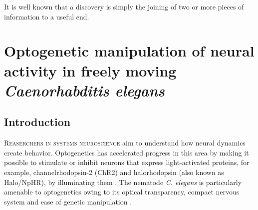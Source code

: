 
\begin{savequote}[75mm] 
It is well known that a discovery is simply the joining of two or more pieces of information to a useful end.
\end{savequote}


\chapter{Optogenetic manipulation of neural activity in freely moving \textit{Caenorhabditis elegans}}\label{chapter:colbert}



\section{Introduction}
\lettrine{R}{easerchers in systems neuroscience} aim to understand how neural dynamics create behavior. Optogenetics has accelerated progress in this area by making it possible to stimulate or inhibit neurons that express light-activated proteins, for example, channelrhodopsin-2 (ChR2) and halorhodopsin (also known as Halo/NpHR), by illuminating them \citep{nagel_channelrhodopsin-2_2003, boyden_millisecond-timescale_2005, zhang_channelrhodopsin-2_2006, han_multiple-color_2007,szobota_remote_2007,zhang_multimodal_2007,chow_high-performance_2010}. 
The nematode \textit{C. elegans} is particularly amenable to optogenetics owing to its optical transparency, compact nervous system and ease of genetic manipulation \citep{nagel_light_2005, liewald_optogenetic_2008, guo_optical_2009,stirman_high-throughput_2010}.

